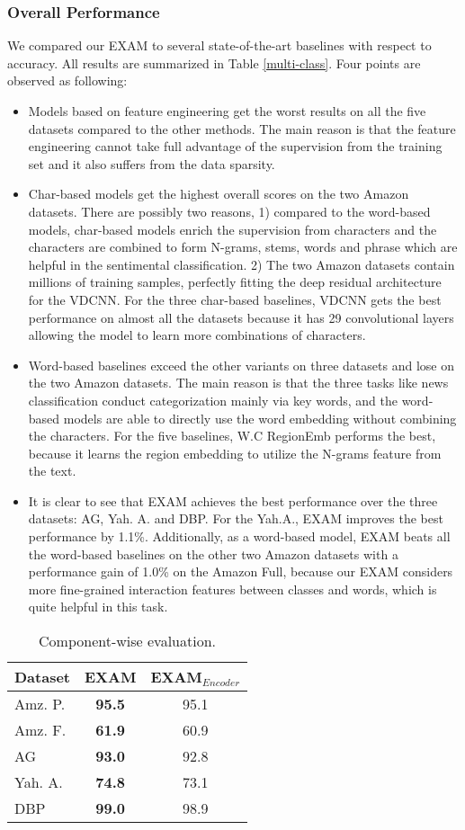 \documentclass[letterpaper]{article} \usepackage{aaai19}  \usepackage{times}  \usepackage{helvet}  \usepackage{courier}  \usepackage{url}  \usepackage{graphicx}
\begin{document}
\subsubsection{Overall Performance}
We compared our EXAM to several state-of-the-art baselines with respect to accuracy. All results are summarized in Table \ref{multi-class}. Four points are observed as following:
\begin{itemize}
\item Models based on feature engineering get the worst results on all the five datasets compared to the other methods. The main reason is that the feature engineering cannot take full advantage of the supervision from the training set and it also suffers from the data sparsity.
\item Char-based models get the highest overall scores on the two Amazon datasets. There are possibly two reasons, 1) compared to the word-based models, char-based models enrich the supervision from characters and the characters are combined to form N-grams, stems, words and phrase which are helpful in the sentimental classification. 2) The two Amazon datasets contain millions of training samples, perfectly fitting the deep residual architecture for the VDCNN. For the three char-based baselines, VDCNN gets the best performance on almost all the datasets because it has 29 convolutional layers allowing the model to learn more combinations of characters.
\item Word-based baselines exceed the other variants on three datasets and lose on the two Amazon datasets. The main reason is that the three tasks like news classification conduct categorization mainly via key words, and the word-based models are able to directly use the word embedding without combining the characters. For the five baselines, W.C RegionEmb performs the best, because it learns the region embedding to utilize the N-grams feature from the text.
\item It is clear to see that EXAM achieves the best performance over the three datasets: AG, Yah. A. and DBP. For the Yah.A., EXAM improves the best performance by 1.1\%. Additionally, as a word-based model, EXAM beats all the word-based baselines on the other two Amazon datasets with a performance gain of 1.0\% on the Amazon Full, because our EXAM considers more fine-grained interaction features between classes and words, which is quite helpful in this task.
\end{itemize}
\begin{table}
  \caption{Component-wise evaluation.}
  \label{componment}
  \centering
\begin{tabular}{lcc}
    \toprule
     Dataset & EXAM & EXAM$_{Encoder}$\\
         \midrule
     Amz. P. & \textbf{95.5}  &95.1 \\
     Amz. F. & \textbf{61.9} &60.9 \\
     AG      &\textbf{93.0}  & 92.8\\
     Yah. A. &\textbf{74.8}  &73.1\\
     DBP     &\textbf{99.0} &98.9 \\
    \bottomrule
  \end{tabular}
\end{table}
\end{document}
